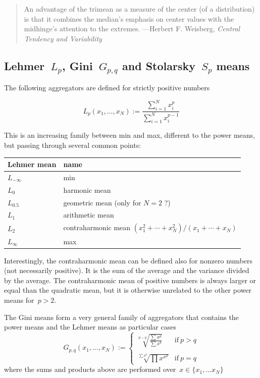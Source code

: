 \medskip

\begin{quote}
An advantage of the trimean as a measure of the center (of a
distribution) is that it combines the median's emphasis on center
values with the midhinge's attention to the extremes.\hfill
	---Herbert F. Weisberg, \emph{Central Tendency and Variability}
\end{quote}

\subsection{Lehmer~$L_p$, Gini~$G_{p,q}$ and Stolarsky~$S_p$ means}

The following aggregators are defined for strictly positive numbers

\[
	L_p(x_1,\ldots,x_N):=\frac{
		\displaystyle\sum_{i=1}^N x_i^p
		}{
		\displaystyle\sum_{i=1}^N x_i^{p-1}
		}
\]

This is an increasing family between min and max, different to the
power means, but passing through several common points:

\medskip

\begin{tabular}{l|l}
	Lehmer mean & name \\
	\hline
	$L_{-\infty}$ & min \\
	$L_0$ & harmonic mean \\
	$L_{0.5}$ & geometric mean (only for $N=2$ ?)\\
	$L_1$ & arithmetic mean \\
	$L_2$ & contraharmonic mean
	$(x_1^2+\cdots+x_N^2)/(x_1+\cdots+x_N)$ \\
	$L_{\infty}$ & max \\
\end{tabular}

\medskip

Interestingly, the contraharmonic mean can be defined also for
nonzero numbers (not necessarily positive).
It is the sum of the average and the variance divided by the average.
The contraharmonic mean of positive numbers is always larger or
equal than the quadratic mean, but it is otherwise unrelated to the
other power means for~$p>2$.

The Gini means form a very general family of aggregators that
contains the power means and the Lehmer means as particular cases
\[
	G_{p,q}(x_1,\ldots,x_N) :=
	\begin{cases}
		\sqrt[p-q]{\displaystyle\frac{\sum x^p}{\sum x^q}}
		& \textrm{if}\ p>q \\
		&\\
		\sqrt[\sum x^p]{\prod x^{x^p}}
		& \textrm{if}\ p=q
	\end{cases}
\]
where the sums and products above are performed over~$x\in\{x_1,\ldots
x_N\}$

